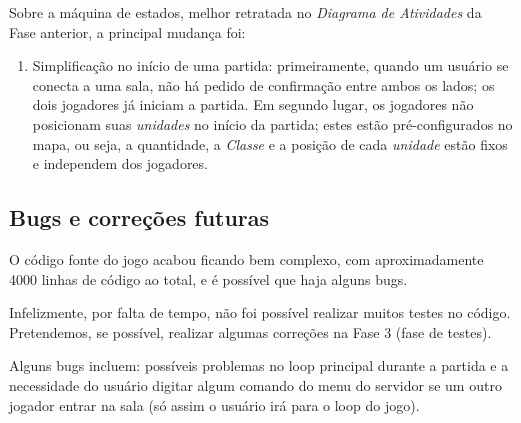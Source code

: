     Sobre a máquina de estados, melhor retratada no \emph{Diagrama de Atividades} da Fase anterior, a principal mudança foi:
    \begin{enumerate}
        \item Simplificação no início de uma partida: primeiramente, quando um usuário se conecta a uma sala, não há pedido de confirmação entre ambos os lados; os dois jogadores já iniciam a partida. Em segundo lugar, os jogadores não posicionam suas \emph{unidades} no início da partida; estes estão pré-configurados no mapa, ou seja, a quantidade, a \emph{Classe} e a posição de cada \emph{unidade} estão fixos e independem dos jogadores.
    \end{enumerate}

\subsection{Bugs e correções futuras}
    O código fonte do jogo acabou ficando bem complexo, com aproximadamente 4000 linhas de código ao total, e é possível que haja alguns bugs.\par
    Infelizmente, por falta de tempo, não foi possível realizar muitos testes no código. Pretendemos, se possível, realizar algumas correções na Fase 3 (fase de testes). \par
    Alguns bugs incluem: possíveis problemas no loop principal durante a partida e a necessidade do usuário digitar algum comando do menu do servidor se um outro jogador entrar na sala (só assim o usuário irá para o loop do jogo).
